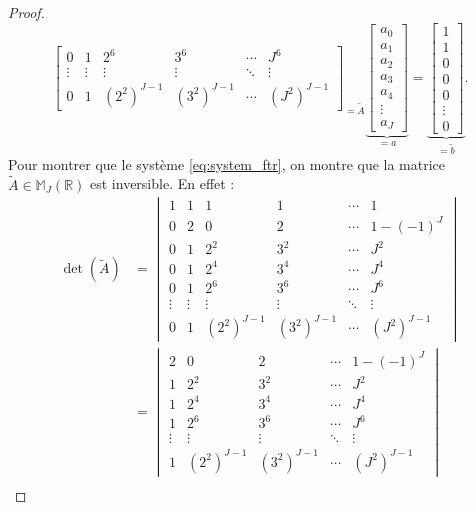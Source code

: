 \begin{proof}
\begin{equation}
{\begin{bmatrix}
0 & 1 & 2^6 & 3^6 & \cdots & J^6 \\
\vdots & \vdots & \vdots & \vdots & \ddots & \vdots \\
0 & 1 & (2^2)^{J-1} & (3^2)^{J-1} & \cdots & (J^2)^{J-1}
\end{bmatrix}}_{= \tilde{A}}
\underbrace{\begin{bmatrix}
a_0 \\ a_1 \\ a_2 \\ a_3 \\ a_4 \\ \vdots \\ a_J
\end{bmatrix}
}_{=a} = \underbrace{\begin{bmatrix}
1 \\ 1 \\ 0 \\ 0 \\ 0 \\ \vdots \\ 0
\end{bmatrix}
}_{= \tilde{b}}.
\end{equation}
Pour montrer que le système \eqref{eq:system_ftr}, on montre que la matrice $\tilde{A} \in \mathbb{M}_J(\mathbb{R})$ est inversible. En effet :
\begin{align*}
\det (\tilde{A}) & = \begin{vmatrix}
1 & 1 & 1 & 1 & \cdots & 1\\
0 & 2 & 0 & 2 & \cdots & 1-(-1)^J\\
0 & 1 & 2^2 & 3^2 & \cdots & J^2 \\
0 & 1 & 2^4 & 3^4 & \cdots & J^4 \\
0 & 1 & 2^6 & 3^6 & \cdots & J^6 \\
\vdots & \vdots & \vdots & \vdots & \ddots & \vdots \\
0 & 1 & (2^2)^{J-1} & (3^2)^{J-1} & \cdots & (J^2)^{J-1}
\end{vmatrix} \\
& = \begin{vmatrix}
2 & 0 & 2 & \cdots & 1-(-1)^J\\
1 & 2^2 & 3^2 & \cdots & J^2 \\
1 & 2^4 & 3^4 & \cdots & J^4 \\
1 & 2^6 & 3^6 & \cdots & J^6 \\
\vdots & \vdots & \vdots & \ddots & \vdots \\
1 & (2^2)^{J-1} & (3^2)^{J-1} & \cdots & (J^2)^{J-1}
\end{vmatrix} \\

\end{align*}
\end{proof}
